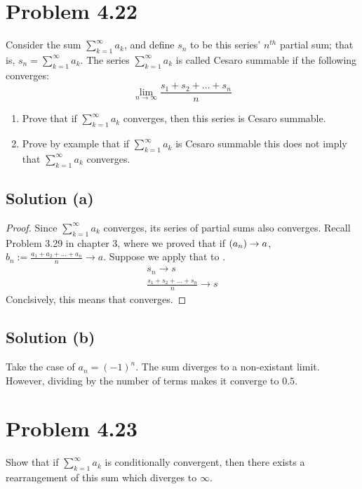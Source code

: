\documentclass[12pt]{report}
\begin{document}
\section{Problem 4.22}
    Consider the sum $\sum_{k = 1}^{\infty} a_k$, and define $s_n$ to be  this series' $n^{th}$ partial sum; that is, $s_n = \sum_{k = 1}^{\infty} a_k$. 
    The series $\sum_{k=1}^{\infty} a_k$ is called Cesaro summable if the following converges:
    \begin{equation*}
        \lim_{n \to \infty} \frac{s_1 + s_2 + \dots + s_n}{n}
    \end{equation*}
    \begin{enumerate}[label=(\alph*)]
        \item   Prove that if $\sum_{k = 1}^{\infty} a_k$ converges, then this series is Cesaro summable.
        \item   Prove by example that if $\sum_{k = 1}^{\infty} a_k$ is Cesaro summable this does not imply that $\sum_{k = 1}^{\infty} a_k$ converges.
    \end{enumerate}

    \subsection{Solution (a)}
        \begin{proof}
            Since $\sum_{k = 1}^{\infty} a_k$ converges, its series of partial sums  also converges.
            Recall Problem 3.29 in chapter 3, where we proved that if $(a _{n}) \to a$, $b_n := \frac{a_1 + a_2 + \dots + a_n}{n} \to a$.
            Suppose we apply that to .
            \begin{gather}
                s_n \to s\\
                \frac{s_1 + s_2 + \dots + s_n}{n} \to s
            \end{gather}
            Conclsively, this means that  converges.
        \end{proof}

    \subsection{Solution (b)}
        Take the case of $a_n = (-1)^n$.
        The sum diverges to a non-existant limit.
        However, dividing by the number of terms makes it converge to $0.5$.
    \pagebreak

\section{Problem 4.23}
    Show that if $\sum_{k = 1}^{\infty} a_k$ is conditionally convergent, then there exists a rearrangement of this sum which diverges to $\infty$. 
\end{document}

